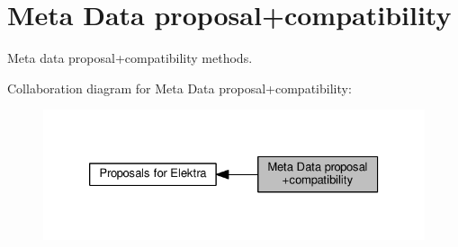 \hypertarget{group__meta}{}\section{Meta Data proposal+compatibility}
\label{group__meta}


Meta data proposal+compatibility methods.  


Collaboration diagram for Meta Data proposal+compatibility\+:
\nopagebreak
\begin{figure}[H]
\begin{center}
\leavevmode
\includegraphics[width=326pt]{group__meta}
\end{center}
\end{figure}
